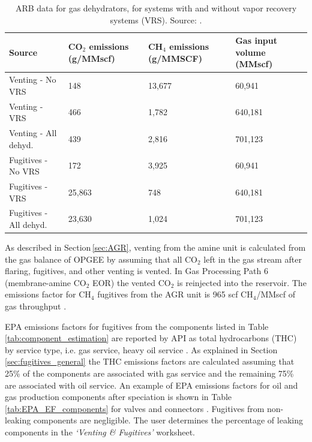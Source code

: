 \documentclass[11pt]{report}
\newcommand{\sheet}[1]{\textit{`{#1}'}}
\begin{document}
{{{{\begin{table}
\begin{scriptsize}
\caption{ARB data for gas dehydrators, for systems with and without vapor recovery systems (VRS). Source: \cite{ARB2013}.}
\label{tab:ARB_dehydrators_EF}
\begin{threeparttable}
\begin{tabular*}{0.9\columnwidth}{p{}p{}p{}p{}}
\toprule
Source & CO$_{2}$ emissions (g/MMscf) & CH$_{4}$ emissions (g/MMSCF) & Gas input volume (MMscf) \\
\midrule
Venting - No VRS & 148 & 13,677 & 60,941 \\ 
Venting - VRS & 466 & 1,782 & 640,181 \\
Venting - All dehyd. & 439 & 2,816 & 701,123 \\
\midrule
Fugitives - No VRS & 172 & 3,925 & 60,941 \\
Fugitives - VRS & 25,863 & 748 & 640,181 \\ 
Fugitives - All dehyd. & 23,630 & 1,024 & 701,123 \\
\bottomrule
\end{tabular*}
\end{threeparttable}
\end{scriptsize}
\end{table}



As described in Section\,\ref{sec:AGR}, venting from the amine unit is calculated from the gas balance of OPGEE by assuming that all CO$_{2}$ left in the gas stream after flaring, fugitives, and other venting is vented. In Gas Processing Path 6 (membrane-amine CO$_2$ EOR) the vented CO$_2$ is reinjected into the reservoir. The emissions factor for CH$_{4}$ fugitives from the AGR unit is 965 scf CH$_{4}$/MMscf of gas throughput \cite[p. 23]{EPA1996}. 

EPA emissions factors for fugitives from the components listed in Table\,\ref{tab:component_estimation} are reported by API as total hydrocarbons (THC) by service type, i.e. gas service, heavy oil service \cite[p. 20]{API1996b}. As explained in Section\,\ref{sec:fugitives_general} the THC emissions factors are calculated assuming that 25\% of the components are associated with gas service and the remaining 75\% are associated with oil service. An example of EPA emissions factors for oil and gas production components after speciation is shown in Table\,\ref{tab:EPA_EF_components} for valves and connectors \cite[p. 20]{API1996b}. Fugitives from non-leaking components are negligible. The user determines the percentage of leaking components in the \sheet{Venting \& Fugitives} worksheet. 

}}}}
\end{document}
